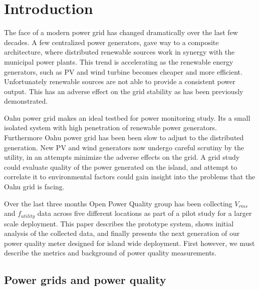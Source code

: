 
\section{Introduction}

The face of a modern power grid has changed dramatically over the last few decades. A few centralized power generators, gave way to a composite architecture, where distributed renewable sources work in synergy with the municipal power plants. This trend is accelerating as the renewable energy generators, such as PV and wind  turbine becomes cheaper and more efficient. Unfortunately renewable sources are not able to provide a consistent power output. This has an adverse effect on the grid stability as has been previously demonstrated.\cite{pq_effect1}\cite{pq_effect2}

Oahu power grid makes an ideal testbed for power monitoring study. Its a small isolated system with high penetration of renewable power generators. Furthermore Oahu power grid has been been slow to adjust to the distributed generation. New PV and wind generators now undergo careful scrutiny by the utility, in an attempts minimize the adverse effects on the grid. A grid study could evaluate quality of the power generated on the island, and attempt to correlate it to environmental factors could gain insight into the problems that the Oahu grid is facing.

Over the last three months Open Power Quality group has been collecting $V_{rms}$ and $f_{utility}$ data across five different locations as part of a pilot study for a larger scale deployment. This paper describes the prototype system, shows initial analysis of the collected data, and finally presents the next generation of our power quality meter designed for island wide deployment. First however, we must describe the metrics and background of power quality measurements.

\subsection{Power grids and power quality}


